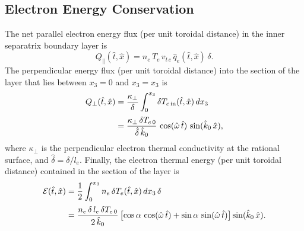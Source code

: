 \documentclass[12pt,prb,aps]{revtex4-1}
\begin{document}
\subsection{Electron Energy Conservation}
The net parallel electron energy flux (per unit toroidal distance) in the inner separatrix boundary layer is
\begin{equation}
Q_\parallel (\hat{t},\hat{x})= n_e\,T_e\,v_{t\,e}\,\hat{q}_e(\hat{t},\hat{x})\,\delta.
\end{equation}
The perpendicular energy flux  (per unit toroidal distance)  into the section of the layer that lies between $x_3=0$ and $x_3=x_3$ is
\begin{align}
Q_\perp (\hat{t},\hat{x}) &= \frac{\kappa_\perp}{\delta} \int_0^{x_3}\delta T_{e\,{\rm in}}(\hat{t},\hat{x})\,dx_3\nonumber\\[0.5ex]
&= \frac{\kappa_\perp\,\delta T_{e\,0}}{\hat{\delta}\,\hat{k}_0}\,\cos(\hat{\omega}\,\hat{t})\,\sin(\hat{k}_0\,\hat{x}),
\end{align}
where $\kappa_\perp$ is the perpendicular electron thermal conductivity at the rational surface, and $\hat{\delta}=\delta/l_e$. Finally, the  electron thermal energy  (per unit toroidal distance) contained in the section of the layer is
\begin{align}
{\cal E}(\hat{t},\hat{x})&=\frac{1}{2}\int_0^{x_3} n_e\,\delta T_e(\hat{t},\hat{x})\,dx_3\,\delta\nonumber\\[0.5ex]
& = \frac{n_e\,\delta\,l_e\,\delta T_{e\,0}}{2\,\hat{k}_0}\left[\cos\alpha\,\cos(\hat{\omega}\,\hat{t})+\sin\alpha\,\sin(\hat{\omega}\,\hat{t})\right]
\sin(\hat{k}_0\,\hat{x}).
\end{align}
\end{document}
